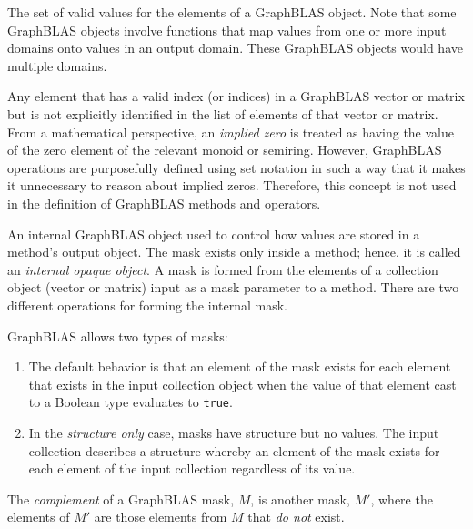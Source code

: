 The set of valid values for the elements of a GraphBLAS object.
Note that some GraphBLAS objects involve functions that map values from one or more input domains 
onto values in an output domain.  These GraphBLAS objects would have multiple domains.

  Any element that has a valid index (or indices) 
in a GraphBLAS vector or matrix but is not explicitly identified in the list of 
elements of that vector or matrix. From a mathematical perspective, an
\emph{implied zero} is treated as having the 
value of the zero element of the relevant monoid or semiring.
However, GraphBLAS operations are purposefully defined using set notation in such a way
that it makes it unnecessary to reason about implied zeros. 
Therefore, this concept is not used in the definition of GraphBLAS methods and operators.

 An internal GraphBLAS object used to control how values 
are stored in a method's output object.  The mask exists only inside a method; hence,
it is called an \emph{internal opaque object}.  A mask is formed from the elements of
a collection object (vector or matrix) input as a mask parameter to a method. There
are two different operations for forming the internal mask.  

GraphBLAS allows two types of masks:
\begin{enumerate}
\item The default 
behavior is that an element of the mask exists for each element that exists in the 
input collection object when the value of that element cast to a Boolean type evaluates to 
{\tt true}.  
\item In the {\it structure only} case, masks have structure but no values. 
The input collection describes a structure whereby an 
element of the mask exists for each element of the input collection regardless of its value.
\end{enumerate}

 The \emph{complement} of a 
GraphBLAS mask, $M$, is another mask, $M'$, where the elements of $M'$
are those elements from $M$ that \emph{do not} exist.  


